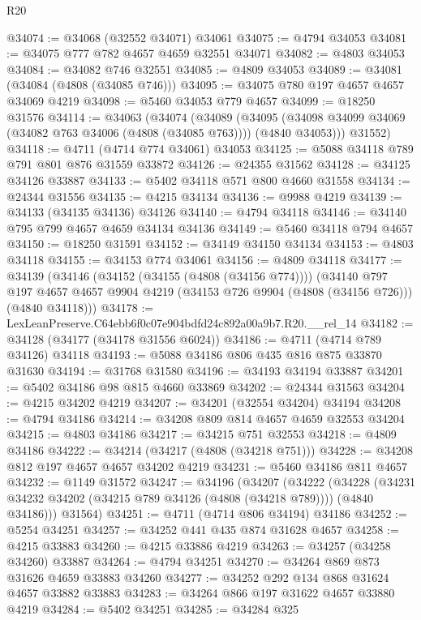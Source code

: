 \begin{lexlean}{R20}
\begin{coremodule}
@34074 := @34068 (@32552 @34071) @34061
@34075 := @4794 @34053
@34081 := @34075 @777 @782 @4657 @4659 @32551 @34071
@34082 := @4803 @34053
@34084 := @34082 @746 @32551
@34085 := @4809 @34053
@34089 := @34081 (@34084 (@4808 (@34085 @746)))
@34095 := @34075 @780 @197 @4657 @4657 @34069 @4219
@34098 := @5460 @34053 @779 @4657
@34099 := @18250 @31576
@34114 := @34063
    (@34074
      (@34089
        (@34095 (@34098 @34099 @34069 (@34082 @763 @34006 (@4808 (@34085 @763)))) (@4840 @34053)))
      @31552)
@34118 := @4711 (@4714 @774 @34061) @34053
@34125 := @5088 @34118 @789 @791 @801 @876 @31559 @33872
@34126 := @24355 @31562
@34128 := @34125 @34126 @33887
@34133 := @5402 @34118 @571 @800 @4660 @31558
@34134 := @24344 @31556
@34135 := @4215 @34134
@34136 := @9988 @4219
@34139 := @34133 (@34135 @34136) @34126
@34140 := @4794 @34118
@34146 := @34140 @795 @799 @4657 @4659 @34134 @34136
@34149 := @5460 @34118 @794 @4657
@34150 := @18250 @31591
@34152 := @34149 @34150 @34134
@34153 := @4803 @34118
@34155 := @34153 @774 @34061
@34156 := @4809 @34118
@34177 := @34139
    (@34146
      (@34152 (@34155 (@4808 (@34156 @774))))
      (@34140
        @797
        @197
        @4657
        @4657
        @9904
        @4219
        (@34153 @726 @9904 (@4808 (@34156 @726)))
        (@4840 @34118)))
@34178 := LexLeanPreserve.C64ebb6f0c07e904bdfd24c892a00a9b7.R20.__rel_14
@34182 := @34128 (@34177 (@34178 @31556 @6024))
@34186 := @4711 (@4714 @789 @34126) @34118
@34193 := @5088 @34186 @806 @435 @816 @875 @33870 @31630
@34194 := @31768 @31580
@34196 := @34193 @34194 @33887
@34201 := @5402 @34186 @98 @815 @4660 @33869
@34202 := @24344 @31563
@34204 := @4215 @34202 @4219
@34207 := @34201 (@32554 @34204) @34194
@34208 := @4794 @34186
@34214 := @34208 @809 @814 @4657 @4659 @32553 @34204
@34215 := @4803 @34186
@34217 := @34215 @751 @32553
@34218 := @4809 @34186
@34222 := @34214 (@34217 (@4808 (@34218 @751)))
@34228 := @34208 @812 @197 @4657 @4657 @34202 @4219
@34231 := @5460 @34186 @811 @4657
@34232 := @1149 @31572
@34247 := @34196
    (@34207
      (@34222
        (@34228 (@34231 @34232 @34202 (@34215 @789 @34126 (@4808 (@34218 @789)))) (@4840 @34186)))
      @31564)
@34251 := @4711 (@4714 @806 @34194) @34186
@34252 := @5254 @34251
@34257 := @34252 @441 @435 @874 @31628 @4657
@34258 := @4215 @33883
@34260 := @4215 @33886 @4219
@34263 := @34257 (@34258 @34260) @33887
@34264 := @4794 @34251
@34270 := @34264 @869 @873 @31626 @4659 @33883 @34260
@34277 := @34252 @292 @134 @868 @31624 @4657 @33882 @33883
@34283 := @34264 @866 @197 @31622 @4657 @33880 @4219
@34284 := @5402 @34251
@34285 := @34284 @325

\end{coremodule}
\end{lexlean}
